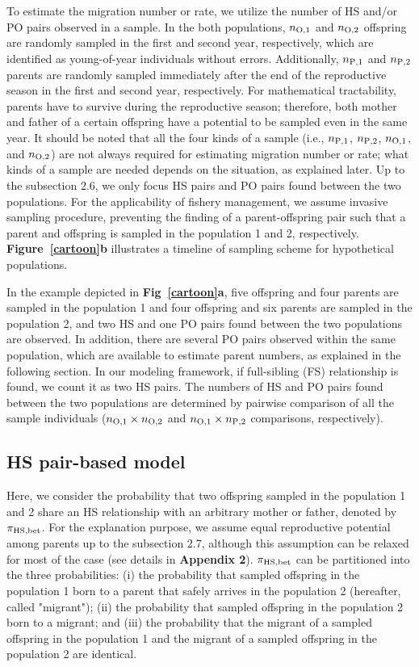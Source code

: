 \documentclass[12pt, English]{article}
\begin{document}
\begin{spacing}{1.9}
To estimate the migration number or rate, we utilize the number of HS and/or PO pairs observed in a sample. In the both populations, $n_{\rm O, 1}$ and $n_{\rm O, 2}$ offspring are randomly sampled in the first and second year, respectively, which are identified as young-of-year individuals without errors. Additionally, $n_{\rm P, 1}$ and $n_{\rm P, 2}$ parents are randomly sampled immediately after the end of the reproductive season in the first and second year, respectively. For mathematical tractability, parents have to survive during the reproductive season; therefore, both mother and father of a certain offspring have a potential to be sampled even in the same year. It should be noted that all the four kinds of a sample (i.e., $n_{\rm P, 1}$, $n_{\rm P, 2}$, $n_{\rm O, 1}$, and $n_{\rm O, 2}$) are not always required for estimating migration number or rate; what kinds of a sample are needed depends on the situation, as explained later. Up to the subsection 2.6, we only focus HS pairs and PO pairs found between the two populations. For the applicability of fishery management, we assume invasive sampling procedure, preventing the finding of a parent-offspring pair such that a parent and offspring is sampled in the population 1 and 2, respectively. {\bf Figure~\ref{cartoon}b} illustrates a timeline of sampling scheme for hypothetical populations. 

In the example depicted in {\bf Fig~\ref{cartoon}a}, five offspring and four parents are sampled in the population 1 and four offspring and six parents are sampled in the population 2, and two HS and one PO pairs found between the two populations are observed. In addition, there are several PO pairs observed within the same population, which are available to estimate parent numbers, as explained in the following section. In our modeling framework, if full-sibling (FS) relationship is found, we count it as two HS pairs. The numbers of HS and PO pairs found between the two populations are determined by pairwise comparison of all the sample individuals ($n_{\rm O,1}\times n_{\rm O,2}$ and $n_{\rm O,1}\times n_{\rm P,2}$ comparisons, respectively). 

\subsection{HS pair-based model}

Here, we consider the probability that two offspring sampled in the population 1 and 2 share an HS relationship with an arbitrary mother or father, denoted by $\pi_{\rm HS, bet}$. For the explanation purpose, we assume equal reproductive potential among parents up to the subsection 2.7, although this assumption can be relaxed for most of the case (see details in {\bf Appendix 2}). $\pi_{\rm HS, bet}$ can be partitioned into the three probabilities: (i) the probability that sampled offspring in the population 1 born to a parent that safely arrives in the population 2 (hereafter, called "migrant"); (ii) the probability that sampled offspring in the population 2 born to a migrant; and (iii) the probability that the migrant of a sampled offspring in the population 1 and the migrant of a sampled offspring in the population 2 are identical. 


\end{spacing}
\end{document}
